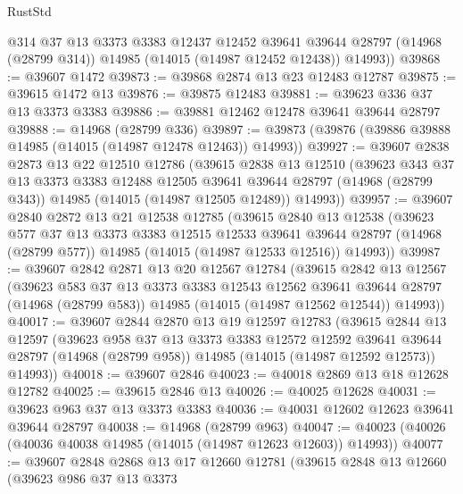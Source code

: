 \begin{lexlean}{RustStd}
\begin{coremodule}
        @314
        @37
        @13
        @3373
        @3383
        @12437
        @12452
        @39641
        @39644
        @28797
        (@14968 (@28799 @314))
        @14985
        (@14015 (@14987 @12452 @12438))
        @14993))
@39868 := @39607 @1472
@39873 := @39868 @2874 @13 @23 @12483 @12787
@39875 := @39615 @1472 @13
@39876 := @39875 @12483
@39881 := @39623 @336 @37 @13 @3373 @3383
@39886 := @39881 @12462 @12478 @39641 @39644 @28797
@39888 := @14968 (@28799 @336)
@39897 := @39873 (@39876 (@39886 @39888 @14985 (@14015 (@14987 @12478 @12463)) @14993))
@39927 := @39607
    @2838
    @2873
    @13
    @22
    @12510
    @12786
    (@39615
      @2838
      @13
      @12510
      (@39623
        @343
        @37
        @13
        @3373
        @3383
        @12488
        @12505
        @39641
        @39644
        @28797
        (@14968 (@28799 @343))
        @14985
        (@14015 (@14987 @12505 @12489))
        @14993))
@39957 := @39607
    @2840
    @2872
    @13
    @21
    @12538
    @12785
    (@39615
      @2840
      @13
      @12538
      (@39623
        @577
        @37
        @13
        @3373
        @3383
        @12515
        @12533
        @39641
        @39644
        @28797
        (@14968 (@28799 @577))
        @14985
        (@14015 (@14987 @12533 @12516))
        @14993))
@39987 := @39607
    @2842
    @2871
    @13
    @20
    @12567
    @12784
    (@39615
      @2842
      @13
      @12567
      (@39623
        @583
        @37
        @13
        @3373
        @3383
        @12543
        @12562
        @39641
        @39644
        @28797
        (@14968 (@28799 @583))
        @14985
        (@14015 (@14987 @12562 @12544))
        @14993))
@40017 := @39607
    @2844
    @2870
    @13
    @19
    @12597
    @12783
    (@39615
      @2844
      @13
      @12597
      (@39623
        @958
        @37
        @13
        @3373
        @3383
        @12572
        @12592
        @39641
        @39644
        @28797
        (@14968 (@28799 @958))
        @14985
        (@14015 (@14987 @12592 @12573))
        @14993))
@40018 := @39607 @2846
@40023 := @40018 @2869 @13 @18 @12628 @12782
@40025 := @39615 @2846 @13
@40026 := @40025 @12628
@40031 := @39623 @963 @37 @13 @3373 @3383
@40036 := @40031 @12602 @12623 @39641 @39644 @28797
@40038 := @14968 (@28799 @963)
@40047 := @40023 (@40026 (@40036 @40038 @14985 (@14015 (@14987 @12623 @12603)) @14993))
@40077 := @39607
    @2848
    @2868
    @13
    @17
    @12660
    @12781
    (@39615
      @2848
      @13
      @12660
      (@39623
        @986
        @37
        @13
        @3373

\end{coremodule}
\end{lexlean}
